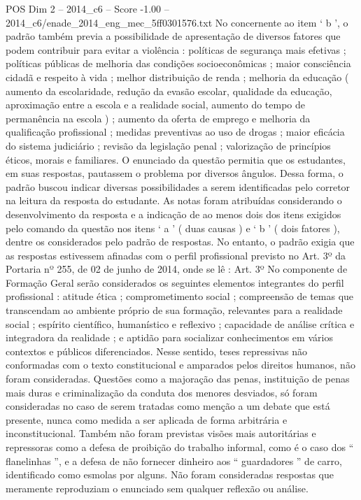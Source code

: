 \begin{textsample}{POS Dim 2 – 2014\_c6 – Score -1.00 – 2014\_c6/enade\_2014\_eng\_mec\_5ff0301576.txt}
No concernente ao item ‘ b ’, o padrão também previa a possibilidade de apresentação de diversos fatores que podem contribuir para evitar a violência : políticas de segurança mais efetivas ; políticas públicas de melhoria das condições socioeconômicas ; maior consciência cidadã e respeito à vida ; melhor distribuição de renda ; melhoria da educação ( aumento da escolaridade, redução da evasão escolar, qualidade da educação, aproximação entre a escola e a realidade social, aumento do tempo de permanência na escola ) ; aumento da oferta de emprego e melhoria da qualificação profissional ; medidas preventivas ao uso de drogas ; maior eficácia do sistema judiciário ; revisão da legislação penal ; valorização de princípios éticos, morais e familiares.
O enunciado da questão permitia que os estudantes, em suas respostas, pautassem o problema por diversos ângulos.
Dessa forma, o padrão buscou indicar diversas possibilidades a serem identificadas pelo corretor na leitura da resposta do estudante.
As notas foram atribuídas considerando o desenvolvimento da resposta e a indicação de ao menos dois dos itens exigidos pelo comando da questão nos itens ‘ a ’ ( duas causas ) e ‘ b ’ ( dois fatores ), dentre os considerados pelo padrão de respostas.
No entanto, o padrão exigia que as respostas estivessem afinadas com o perfil profissional previsto no Art. 3º da Portaria nº 255, de 02 de junho de 2014, onde se lê : Art. 3º No componente de Formação Geral serão considerados os seguintes elementos integrantes do perfil profissional : atitude ética ; comprometimento social ; compreensão de temas que transcendam ao ambiente próprio de sua formação, relevantes para a realidade social ; espírito científico, humanístico e reflexivo ; capacidade de análise crítica e integradora da realidade ; e aptidão para socializar conhecimentos em vários contextos e públicos diferenciados.
Nesse sentido, teses repressivas não conformadas com o texto constitucional e amparados pelos direitos humanos, não foram consideradas.
Questões como a majoração das penas, instituição de penas mais duras e criminalização da conduta dos menores desviados, só foram consideradas no caso de serem tratadas como menção a um debate que está presente, nunca como medida a ser aplicada de forma arbitrária e inconstitucional.
Também não foram previstas visões mais autoritárias e repressoras como a defesa de proibição do trabalho informal, como é o caso dos “ flanelinhas ”, e a defesa de não fornecer dinheiro aos “ guardadores ” de carro, identificado como esmolas por alguns.
Não foram consideradas respostas que meramente reproduziam o enunciado sem qualquer reflexão ou análise.

\end{textsample}
